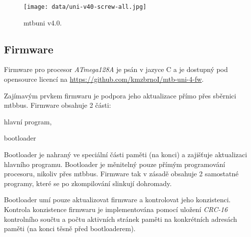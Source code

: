 \begin{figure}[ht]
\texttt{[image: data/uni-v40-screw-all.jpg]}
\caption{\gls{mtbuni} v4.0.}
\label{fig:mtb-uni-v4}
\end{figure}

\subsection{Firmware}

Firmware pro procesor \textit{ATmega128A} je psán v jazyce C a je dostupný
pod opensource licencí na \url{https://github.com/kmzbrnoI/mtb-uni-4-fw}.

Zajímavým prvkem firmwaru je podpora jeho aktualizace přímo přes sběrnici
\gls{mtbbus}. Firmware obsahuje 2 části:

\begin{compactenum}
\item hlavní program,
\item bootloader
\end{compactenum}

Bootloader je nahraný ve speciální části paměti (na konci) a zajišťuje
aktualizaci hlavního programu. Bootloader je měnitelný pouze přímým
programování procesoru, nikoliv přes \gls{mtbbus}. Firmware tak v zásadě
obsahuje 2 samostatné programy, které se po zkompilování slinkují dohromady.

Bootloader umí pouze aktualizovat firmware a kontrolovat jeho konzistenci.
Kontrola konzistence firmwaru je implementována pomocí uložení \textit{CRC-16}
kontrolního součtu a počtu aktivních stránek paměti na konkrétních adresách
paměti (na konci těsně před bootloaderem).
